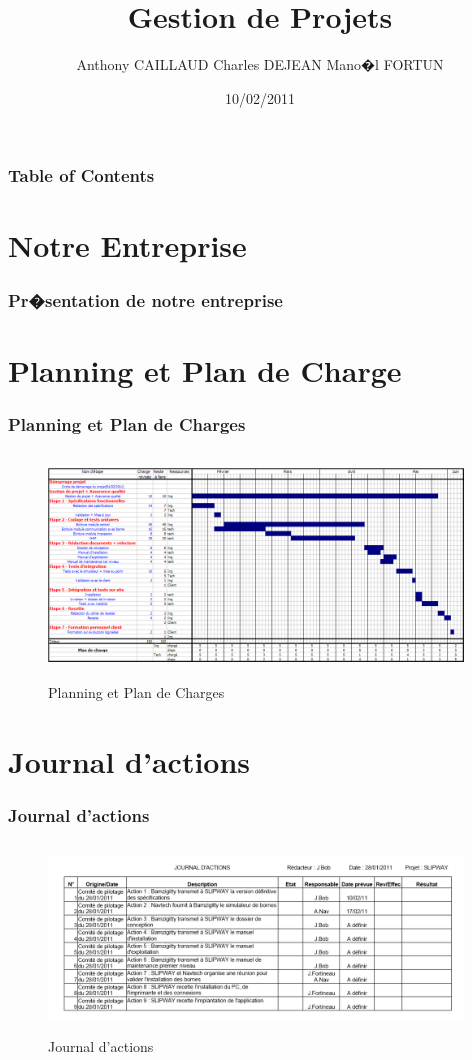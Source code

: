 \documentclass{beamer}
\title{Gestion de Projets}
\author{Anthony CAILLAUD Charles DEJEAN Mano�l FORTUN}
\date{10/02/2011}
\begin{document}
\begin{frame}
\titlepage
\end{frame}



\begin{frame}
\frametitle{Table of Contents}
\tableofcontents[hideallsubsections]
\end{frame}

\section{Notre Entreprise}

\begin{frame}\frametitle{Pr�sentation de notre entreprise}

\end{frame}

\section{Planning et Plan de Charge}

\begin{frame}\frametitle{Planning et Plan de Charges}
\begin{figure}[t]
  		\centering
  		\includegraphics[height=6cm,width=11cm]{images/Planning.PNG}
  		\caption{Planning et Plan de Charges}
  		\label{Planning}
	\end{figure}
\end{frame}

\section{Journal d'actions}

\begin{frame}\frametitle{Journal d'actions}
\begin{figure}[t]
  		\centering
  		\includegraphics[height=5cm,width=11cm]{images/journal_dactions.PNG}
  		\caption{Journal d'actions}
  		\label{JournalActions}
	\end{figure}
\end{frame}
\end{document}
